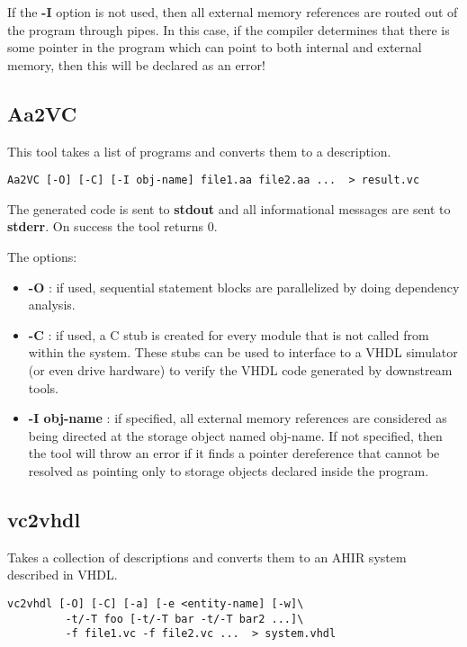 If the {\bf -I} option is not used, then all external memory
references are routed out of the \Aa program through pipes.
In this case, if the \Aa compiler determines that there is some pointer 
in the program which can point
to both internal and external memory, then this will be
declared as an error!  

\subsection{{\bf Aa2VC}}

This tool takes a list of \Aa programs and converts them
to a \vC description. 
\begin{verbatim}
Aa2VC [-O] [-C] [-I obj-name] file1.aa file2.aa ...  > result.vc
\end{verbatim}
The generated \vC code is sent to {\bf stdout} and all informational
messages are sent to {\bf stderr}.  On success the tool returns 0.

The options:
\begin{itemize}
\item {\bf -O} : if used, sequential statement blocks are parallelized
by doing dependency analysis.
\item {\bf -C} : if used, a C stub is created for every module that
is not called from within the system.  These stubs can be used to
interface to a VHDL simulator (or even drive hardware) to verify
the VHDL code generated by downstream tools.
\item {\bf -I obj-name} : if specified, all external memory references
are considered as being directed at the storage object named obj-name.
If not specified, then the tool will throw an error if it finds
a pointer dereference that cannot be resolved as pointing only to
storage objects declared inside the \Aa program.
\end{itemize}

\subsection{\bf vc2vhdl}

Takes a collection of \vC descriptions and converts them to
an AHIR system described in VHDL.
\begin{verbatim}
vc2vhdl [-O] [-C] [-a] [-e <entity-name] [-w]\
         -t/-T foo [-t/-T bar -t/-T bar2 ...]\
         -f file1.vc -f file2.vc ...  > system.vhdl
\end{verbatim}

